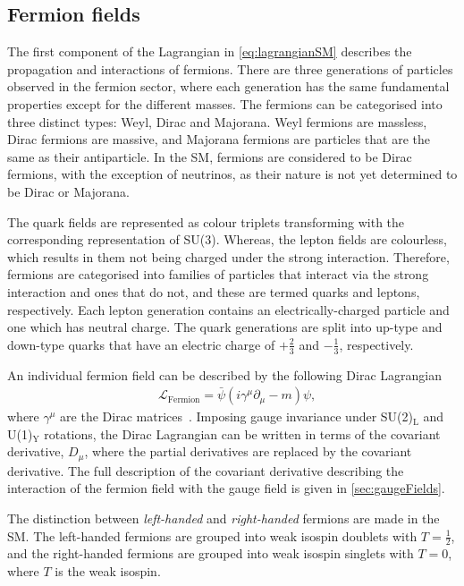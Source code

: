\subsection{Fermion fields}\label{sec:fermionFields}
The first component of the Lagrangian in \cref{eq:lagrangianSM} describes the propagation and interactions of fermions. There are three generations of particles observed in the fermion sector, where each generation has the same fundamental properties except for the different masses. The fermions can be categorised into three distinct types: Weyl, Dirac and Majorana. Weyl fermions are massless, Dirac fermions are massive, and Majorana fermions are particles that are the same as their antiparticle. In the SM, fermions are considered to be Dirac fermions, with the exception of neutrinos, as their nature is not yet determined to be Dirac or Majorana. 

The quark fields are represented as colour triplets transforming with the corresponding representation of SU(3). Whereas, the lepton fields are colourless, which results in them not being charged under the strong interaction. Therefore, fermions are categorised into families of particles that interact via the strong interaction and ones that do not, and these are termed quarks and leptons, respectively. Each lepton generation contains an electrically-charged particle and one which has neutral charge. The quark generations are split into up-type and down-type quarks that have an electric charge of $+\frac{2}{3}$ and $-\frac{1}{3}$, respectively. 

An individual fermion field can be described by the following Dirac Lagrangian
\begin{equation}
    \label{eq:lagrangianFermion}
    \begin{aligned}
        & \mathcal{L}_\mathrm{Fermion} = \bar{\psi}\left(i\gamma^\mu \partial_\mu - m\right)\psi,
    \end{aligned}
\end{equation}
where $\gamma^{\mu}$ are the Dirac matrices~\cite{doi:10.1098/rspa.1928.0023}. Imposing gauge invariance under SU(2)$_\mathrm{L}$ and U(1)$_\mathrm{Y}$ rotations, the Dirac Lagrangian can be written in terms of the covariant derivative, $D_\mu$, where the partial derivatives are replaced by the covariant derivative. The full description of the covariant derivative describing the interaction of the fermion field with the gauge field is given in \cref{sec:gaugeFields}. 

The distinction between \emph{left-handed} and \emph{right-handed} fermions are made in the SM. The left-handed fermions are grouped into weak isospin doublets with $T = \frac{1}{2}$, and the right-handed fermions are grouped into weak isospin singlets with $T = 0$, where $T$ is the weak isospin. 

